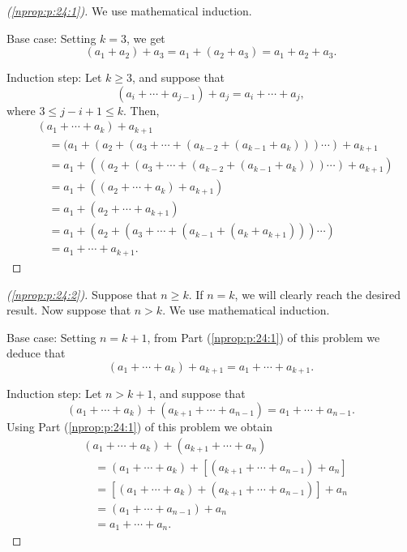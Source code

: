 \begin{done}
	\begin{proof}[(\ref{nprop:p:24:1})]
		We use mathematical induction.

		Base case: Setting $k = 3$, we get
		$$
			(a_1 + a_2) + a_3 = a_1 + (a_2 + a_3) = a_1 + a_2 + a_3.
		$$

		Induction step: Let $k \geq 3$, and suppose that
		$$
			(a_i + \cdots + a_{j - 1}) + a_j = a_i + \cdots + a_j,
		$$
		where $3 \leq j - i + 1 \leq k$. Then,
		\begin{align*}
			 & (a_1 + \cdots + a_k) + a_{k + 1}                                                             \\
			 & \quad = (a_1 + (a_2 + (a_3 + \cdots + (a_{k - 2} + (a_{k - 1} + a_k))) \cdots ) + a_{k + 1}  \\
			 & \quad = a_1 + ((a_2 + (a_3 + \cdots + (a_{k - 2} + (a_{k - 1} + a_k))) \cdots ) + a_{k + 1}) \\
			 & \quad = a_1 + ((a_2 + \cdots + a_k) + a_{k + 1})                                             \\
			 & \quad = a_1 + (a_2 + \cdots + a_{k + 1})                                                     \\
			 & \quad = a_1 + (a_2 + (a_3 + \cdots + (a_{k - 1} + (a_k + a_{k + 1}))) \cdots )               \\
			 & \quad = a_1 + \cdots + a_{k + 1}.
		\end{align*}
	\end{proof}
\end{done}

\begin{proof}[(\ref{nprop:p:24:2})]
	Suppose that $n \geq k$. If $n = k$, we will clearly reach the desired result. Now suppose that $n > k$. We use mathematical induction.

	Base case: Setting $n = k + 1$, from Part (\ref{nprop:p:24:1}) of this problem we deduce that
	$$
		(a_1 + \cdots + a_k) + a_{k + 1} = a_1 + \cdots + a_{k + 1}.
	$$

	Induction step: Let $n > k + 1$, and suppose that
	$$
		(a_1 + \cdots + a_k) + (a_{k + 1} + \cdots + a_{n - 1}) = a_1 + \cdots + a_{n - 1}.
	$$
	Using Part (\ref{nprop:p:24:1}) of this problem we obtain
	\begin{align*}
		 & (a_1 + \cdots + a_k) + (a_{k + 1} + \cdots + a_n)                                    \\
		 & \quad = (a_1 + \cdots + a_k) + \left[ (a_{k + 1} + \cdots + a_{n - 1}) + a_n \right] \\
		 & \quad = \left[ (a_1 + \cdots + a_k) + (a_{k + 1} + \cdots + a_{n - 1}) \right] + a_n \\
		 & \quad = (a_1 + \cdots + a_{n - 1}) + a_n                                             \\
		 & \quad = a_1 + \cdots + a_n.
	\end{align*}
\end{proof}

